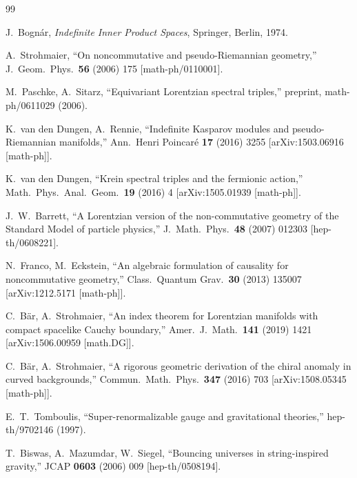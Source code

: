 \documentclass[12pt,a4paper]{article}
\theoremstyle{definition}
\theoremstyle{remark}
\begin{document}
\begin{thebibliography}{99}

  J.~Bogn\'{a}r,
  \emph{Indefinite Inner Product Spaces},
  Springer, Berlin, 1974.

  A.~Strohmaier,
  ``On noncommutative and pseudo-Riemannian geometry,''
  J.\ Geom.\ Phys.\ \textbf{56} (2006) 175
  [math-ph/0110001].

  M.~Paschke, A.~Sitarz,
  ``Equivariant Lorentzian spectral triples,''
  preprint, math-ph/0611029 (2006).

  K.~van den Dungen, A.~Rennie,
  ``Indefinite Kasparov modules and pseudo-Riemannian manifolds,''
  Ann.\ Henri Poincar\'{e} \textbf{17} (2016) 3255
  [arXiv:1503.06916 [math-ph]].

  K.~van den Dungen,
  ``Krein spectral triples and the fermionic action,''
  Math.\ Phys.\ Anal.\ Geom.\ \textbf{19} (2016) 4
  [arXiv:1505.01939 [math-ph]].

  J.~W.~Barrett,
  ``A Lorentzian version of the non-commutative geometry of the
  Standard Model of particle physics,''
  J.\ Math.\ Phys.\ \textbf{48} (2007) 012303
  [hep-th/0608221].

  N.~Franco, M.~Eckstein,
  ``An algebraic formulation of causality for noncommutative
  geometry,''
  Class.\ Quantum Grav.\ \textbf{30} (2013) 135007
  [arXiv:1212.5171 [math-ph]].

  C.~B\"{a}r, A.~Strohmaier,
  ``An index theorem for Lorentzian manifolds with compact spacelike
  Cauchy boundary,''
  Amer.\ J.\ Math.\ \textbf{141} (2019) 1421
  [arXiv:1506.00959 [math.DG]].

  C.~B\"{a}r, A.~Strohmaier,
  ``A rigorous geometric derivation of the chiral anomaly in curved
  backgrounds,''
  Commun.\ Math.\ Phys.\ \textbf{347} (2016) 703
  [arXiv:1508.05345 [math-ph]].

  E.~T.~Tomboulis,
  ``Super-renormalizable gauge and gravitational theories,''
  hep-th/9702146 (1997).

  T.~Biswas, A.~Mazumdar, W.~Siegel,
  ``Bouncing universes in string-inspired gravity,''
  JCAP \textbf{0603} (2006) 009
  [hep-th/0508194].


\end{thebibliography}
\end{document}
